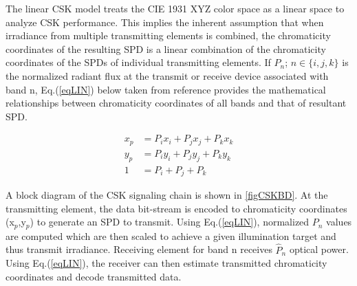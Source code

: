 \documentclass[10pt,letterpaper]{article}
\begin{document}
The linear CSK model treats the CIE 1931 XYZ color space as a linear space to analyze CSK performance. This implies the inherent assumption that when irradiance from multiple transmitting elements is combined, the chromaticity coordinates of the resulting SPD is a linear combination of the chromaticity coordinates of the SPDs of individual transmitting elements. If $P_{n}$; $n\in\{i,j,k\}$ is the normalized radiant flux at the transmit or receive device associated with band n, Eq.(\ref{eqLIN}) below taken from reference \cite{ieee802.15.7} provides the mathematical relationships between chromaticity coordinates of all bands and that of resultant SPD.

\begin{equation}
	\begin{aligned}
	x_{p} &= P_{i}x_{i} + P_{j}x_{j} + P_{k}x_{k}\\
	y_{p} &= P_{i}y_{i} + P_{j}y_{j} + P_{k}y_{k}\\
	1 &= P_{i} + P_{j} + P_{k}
\end{aligned}
\label{eqLIN}
\end{equation}

A block diagram of the CSK signaling chain is shown in \figurename\ref{figCSKBD}. At the transmitting element, the data bit-stream is encoded to chromaticity coordinates (x$_p$,y$_p$) to generate an SPD to transmit. Using Eq.(\ref{eqLIN}), normalized $P_{n}$ values are computed which are then scaled to achieve a given illumination target and thus transmit irradiance. Receiving element for band n receives $\hat{P}_{n}$ optical power. Using Eq.(\ref{eqLIN}), the receiver can then estimate transmitted chromaticity coordinates and decode transmitted data.
\end{document}
